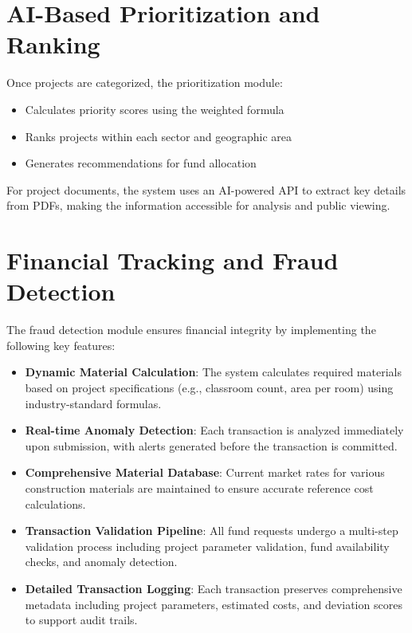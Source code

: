 \documentclass[12pt,a4paper]{report}
\begin{document}
\section{AI-Based Prioritization and Ranking}
\indent \indent Once projects are categorized, the prioritization module:

\begin{itemize}
    \item Calculates priority scores using the weighted formula
    \item Ranks projects within each sector and geographic area
    \item Generates recommendations for fund allocation
\end{itemize}

\noindent For project documents, the system uses an AI-powered API to extract key details from PDFs, making the information accessible for analysis and public viewing.

\section{Financial Tracking and Fraud Detection}
\indent \indent The fraud detection module ensures financial integrity by implementing the following key features:

\begin{itemize}
    \item \textbf{Dynamic Material Calculation}: The system calculates required materials based on project specifications (e.g., classroom count, area per room) using industry-standard formulas.
    \item \textbf{Real-time Anomaly Detection}: Each transaction is analyzed immediately upon submission, with alerts generated before the transaction is committed.
    \item \textbf{Comprehensive Material Database}: Current market rates for various construction materials are maintained to ensure accurate reference cost calculations.
    \item \textbf{Transaction Validation Pipeline}: All fund requests undergo a multi-step validation process including project parameter validation, fund availability checks, and anomaly detection.
    \item \textbf{Detailed Transaction Logging}: Each transaction preserves comprehensive metadata including project parameters, estimated costs, and deviation scores to support audit trails.
\end{itemize}
\end{document}
